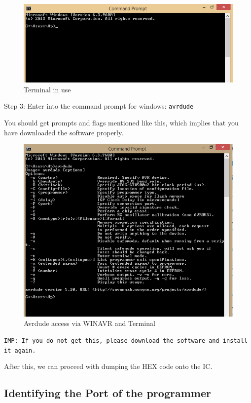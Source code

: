 \documentclass[12pt]{article}
\begin{document}
\begin{figure}[h!]
\centering
\includegraphics[scale=0.7]{Comm.png}
\caption{Terminal in use}
\end{figure}


Step 3: Enter into the command prompt for windows: \texttt{avrdude}


You should get prompts and flags mentioned like this, which implies that you have downloaded the software properly.
\begin{figure}[h]
\centering
\includegraphics[scale=0.8]{avrdude1.png}
\caption{Avrdude access via WINAVR and Terminal}
\end{figure}

\pagebreak
\texttt{IMP: If you do not get this, please download the software and install it again.}\vspace{12pt}

After this, we can proceed with dumping the HEX code onto the IC.
\newpage
\subsection{Identifying the Port of the programmer}
\end{document}
